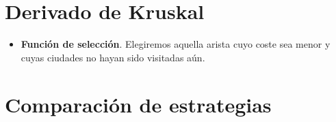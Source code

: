 \documentclass[12pt,spanish]{article}
\begin{document}
\section{Derivado de Kruskal}

\begin{itemize}
	\item \textbf{Función de selección}. Elegiremos aquella arista cuyo coste sea menor y cuyas ciudades no hayan sido visitadas aún.
\end{itemize}


\section{Comparación de estrategias}

\end{document}
